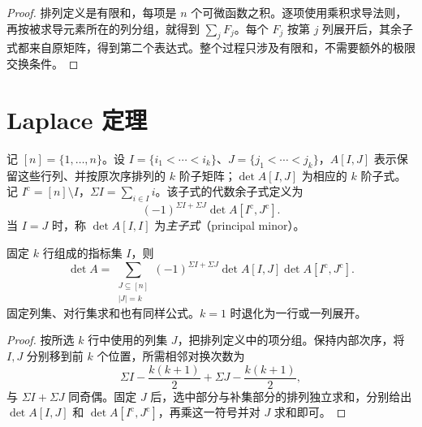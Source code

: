 \begin{proof}
排列定义是有限和，每项是 $n$ 个可微函数之积。逐项使用乘积求导法则，再按被求导元素所在的列分组，就得到 $\sum_jF_j$。每个 $F_j$ 按第 $j$ 列展开后，其余子式都来自原矩阵，得到第二个表达式。整个过程只涉及有限和，不需要额外的极限交换条件。
\end{proof}

\section{Laplace 定理}
\label{sec:xie-ex-det-laplace}

\begin{definition}
\label{def:xie-ex-det-general-minor}
记 $[n]=\{1,\ldots,n\}$。设 $I=\{i_1<\cdots<i_k\}$、$J=\{j_1<\cdots<j_k\}$，$A[I,J]$ 表示保留这些行列、并按原次序排列的 $k$ 阶子矩阵；$\det A[I,J]$ 为相应的 $k$ 阶子式。记 $I^{\mathrm c}=[n]\setminus I$，$\Sigma I=\sum_{i\in I}i$。该子式的代数余子式定义为
\[
(-1)^{\Sigma I+\Sigma J}\det A[I^{\mathrm c},J^{\mathrm c}].
\]
当 $I=J$ 时，称 $\det A[I,I]$ 为\emph{主子式}（principal minor）。
\end{definition}

\begin{theorem}[Laplace 展开]
\label{thm:xie-ex-det-laplace}
固定 $k$ 行组成的指标集 $I$，则
\begin{equation}
\label{eq:xie-ex-det-laplace}
\det A=\sum_{\substack{J\subseteq[n]\\|J|=k}}
(-1)^{\Sigma I+\Sigma J}\det A[I,J]\det A[I^{\mathrm c},J^{\mathrm c}].
\end{equation}
固定列集、对行集求和也有同样公式。$k=1$ 时退化为一行或一列展开。
\end{theorem}

\begin{proof}
按所选 $k$ 行中使用的列集 $J$，把排列定义中的项分组。保持内部次序，将 $I,J$ 分别移到前 $k$ 个位置，所需相邻对换次数为
\[
\Sigma I-\frac{k(k+1)}2+\Sigma J-\frac{k(k+1)}2,
\]
与 $\Sigma I+\Sigma J$ 同奇偶。固定 $J$ 后，选中部分与补集部分的排列独立求和，分别给出 $\det A[I,J]$ 和 $\det A[I^{\mathrm c},J^{\mathrm c}]$，再乘这一符号并对 $J$ 求和即可。
\end{proof}

